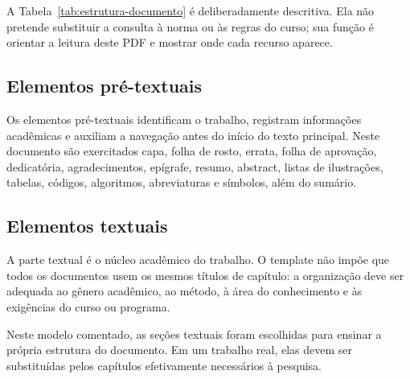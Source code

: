 A Tabela~\ref{tab:estrutura-documento} é deliberadamente descritiva. Ela não pretende substituir a consulta à norma ou às regras do curso; sua função é orientar a leitura deste PDF e mostrar onde cada recurso aparece.

\subsection{Elementos pré-textuais}

Os elementos pré-textuais identificam o trabalho, registram informações acadêmicas e auxiliam a navegação antes do início do texto principal. Neste documento são exercitados capa, folha de rosto, errata, folha de aprovação, dedicatória, agradecimentos, epígrafe, resumo, abstract, listas de ilustrações, tabelas, códigos, algoritmos, abreviaturas e símbolos, além do sumário.



\subsection{Elementos textuais}

A parte textual é o núcleo acadêmico do trabalho. O template não impõe que todos os documentos usem os mesmos títulos de capítulo: a organização deve ser adequada ao gênero acadêmico, ao método, à área do conhecimento e às exigências do curso ou programa.

Neste modelo comentado, as seções textuais foram escolhidas para ensinar a própria estrutura do documento. Em um trabalho real, elas devem ser substituídas pelos capítulos efetivamente necessários à pesquisa.


